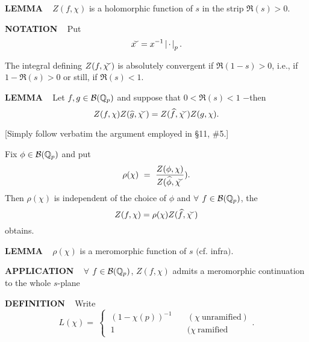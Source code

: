 \begin{x}{\small\bf LEMMA} \ %
$Z(f, \chi)$ is a holomorphic function of $s$ in the strip $\Re(s) > 0$.
\end{x}

\vspace{0.1cm}


\begin{x}{\small\bf NOTATION} \ %
Put
\[
\widecheck{x} = x^{-1}  \acdot_p.
\]

The integral defining $Z(f, \widecheck{\chi})$ is absolutely convergent if  $\Re(1-s) > 0$, i.e., if $1 - \Re(s) > 0$ or still, if $\Re(s) < 1$.
\end{x}

\vspace{0.1cm}


\begin{x}{\small\bf LEMMA} \ %
Let $f, g \in \mathcal{B}(\mathbb{Q}_p)$ and suppose that $0 < \Re(s) < 1$ $-$then
\[
Z(f, \chi)  Z(\widehat{g}, \widecheck{\chi}) = Z(\widehat{f}, \widecheck{\chi}) Z(g, \chi).
\]

[Simply follow verbatim the argument employed in \S11, \#5.]
\end{x}

\vspace{0.1cm}

Fix $\phi \in \mathcal{B}(\mathbb{Q}_p)$ and put
\[
\rho(\chi) \ = \ \frac{Z(\phi,\chi)}{Z(\widehat{\phi},\widecheck{\chi}}).
\]
Then $\rho(\chi)$ is independent of the choice of $\phi$ and $\forall$ $f \in \mathcal{B}(\mathbb{Q}_p)$, the 
\[
Z(f, \chi) = \rho(\chi) Z(\widehat{f}, \widecheck{\chi})
\]
obtains.

\vspace{0.1cm}

\begin{x}{\small\bf LEMMA} \ %
$\rho(\chi)$ is a meromorphic function of $s$ $($cf. infra$)$.
\end{x}

\vspace{0.1cm}

\begin{x}{\small\bf APPLICATION} \ %
$\forall$ $f \in \mathcal{B}(\mathbb{Q}_p)$, $Z(f, \chi)$ admits a meromorphic continuation to the whole $s$-plane
\end{x}

\vspace{0.1cm}

\begin{x}{\small\bf DEFINITION} \ %
Write
\[L(\chi) =\ 
\begin{cases}
\ (1 - \chi(p))^{-1} &\quad (\chi  \ \text{unramified})\\
\ 1 &\quad (\chi \ \text{ramified}
\end{cases}
.\]
\end{x}

